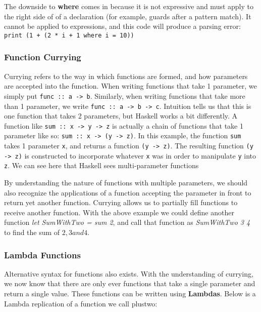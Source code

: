 \documentclass{article}
\begin{document}
            \medskip\noindent
            The downside to \textbf{where} comes in because it is not expressive and must apply to the right side of of a declaration (for example, guards after a pattern match). It cannot be applied to expressions, and this code will produce a parsing error: \lstinline{print (1 + (2 * i + 1 where i = 10))}
            
        \subsubsection{Function Currying}
            Currying refers to the way in which functions are formed, and how parameters are accepted into the function. When writing functions that take 1 parameter, we simply put \lstinline{func :: a -> b}. Similarly, when writing functions that take more than 1 parameter, we write \lstinline{func :: a -> b -> c}. Intuition tells us that this is one function that takes 2 parameters, but Haskell works a bit differently. A function like \lstinline{sum :: x -> y -> z} is actually a chain of functions that take 1 parameter like so: \lstinline{sum :: x -> (y -> z)}. In this example, the function \lstinline{sum} takes 1 parameter \lstinline{x}, and returns a function \lstinline{(y -> z)}. The resulting function \lstinline{(y -> z)} is constructed to incorporate whatever \lstinline{x} was in order to manipulate \lstinline{y} into \lstinline{z}. We can see here that Haskell sees multi-parameter functions
            
            \medskip\noindent
            By understanding the nature of functions with multiple parameters, we should also recognize the applications of a function accepting the parameter in front to return yet another function. Currying allows us to partially fill functions to receive another function. With the above example we could define another function \textit{let SumWithTwo = sum 2}, and call that function as \textit{SumWithTwo 3 4} to find the sum of $2, 3 and 4$.
        
        \subsubsection{Lambda Functions}
            Alternative syntax for functions also exists. With the understanding of currying, we now know that there are only ever functions that take a single parameter and return a single value. These functions can be written using \textbf{Lambdas}. Below is a Lambda replication of a function we call plus\textunderscore two:
            
\end{document}
